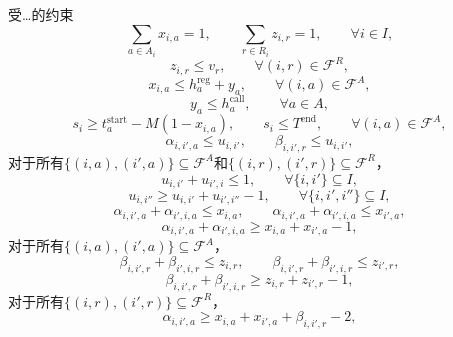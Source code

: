\documentclass[11pt,a4paper]{article}
\begin{document}
受…的约束
\begin{equation}
\sum_{a \in A_i} x_{i,a} = 1,
\qquad
\sum_{r \in R_i} z_{i,r} = 1,
\qquad \forall i \in I,
\tag{M2}
\end{equation}
\begin{equation}
z_{i,r} \le v_r,
\qquad \forall (i,r) \in \mathcal{F}^R,
\tag{M3}
\end{equation}
\begin{equation}
x_{i,a} \le h_a^{\mathrm{reg}} + y_a,
\qquad \forall (i,a) \in \mathcal{F}^A,
\tag{M4}
\end{equation}
\begin{equation}
y_a \le h_a^{\mathrm{call}},
\qquad \forall a \in A,
\tag{M5}
\end{equation}
\begin{equation}
s_i \ge t_a^{\mathrm{start}} - M(1-x_{i,a}),
\qquad
s_i \le T^{\mathrm{end}},
\qquad \forall (i,a) \in \mathcal{F}^A,
\tag{M6}
\end{equation}
\begin{equation}
\alpha_{i,i',a} \le u_{i,i'},
\qquad
\beta_{i,i',r} \le u_{i,i'},
\tag{M7}
\end{equation}
对于所有$\{(i,a),(i',a)\}\subseteq \mathcal{F}^A$和$\{(i,r),(i',r)\}\subseteq \mathcal{F}^R$，
\begin{equation}
u_{i,i'} + u_{i',i} \le 1,
\qquad \forall \{i,i'\} \subseteq I,
\tag{M8}
\end{equation}
\begin{equation}
u_{i,i''} \ge u_{i,i'} + u_{i',i''} - 1,
\qquad \forall \{i,i',i''\} \subseteq I,
\tag{M9}
\end{equation}
\begin{equation}
\alpha_{i,i',a} + \alpha_{i',i,a} \le x_{i,a},
\qquad
\alpha_{i,i',a} + \alpha_{i',i,a} \le x_{i',a},
\tag{M10}
\end{equation}
\begin{equation}
\alpha_{i,i',a} + \alpha_{i',i,a} \ge x_{i,a} + x_{i',a} - 1,
\tag{M11}
\end{equation}
对于所有$\{(i,a),(i',a)\}\subseteq \mathcal{F}^A$，
\begin{equation}
\beta_{i,i',r} + \beta_{i',i,r} \le z_{i,r},
\qquad
\beta_{i,i',r} + \beta_{i',i,r} \le z_{i',r},
\tag{M12}
\end{equation}
\begin{equation}
\beta_{i,i',r} + \beta_{i',i,r} \ge z_{i,r} + z_{i',r} - 1,
\tag{M13}
\end{equation}
对于所有$\{(i,r),(i',r)\}\subseteq \mathcal{F}^R$，
\begin{equation}
\alpha_{i,i',a} \ge x_{i,a} + x_{i',a} + \beta_{i,i',r} - 2,
\tag{M14}
\end{equation}
\end{document}
